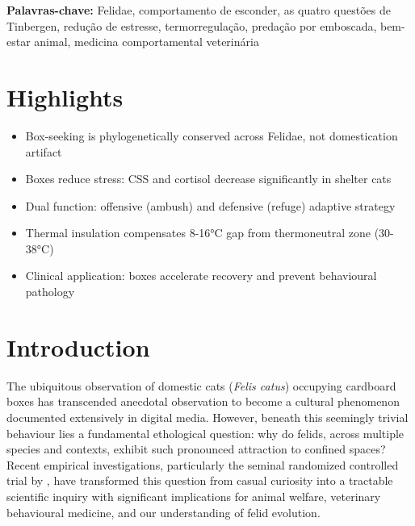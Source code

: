 \documentclass[12pt,a4paper]{article}
\begin{document}
\vspace{1em}

\noindent
\textbf{Palavras-chave:} Felidae, comportamento de esconder, as quatro questões de Tinbergen, redução de estresse, termorregulação, predação por emboscada, bem-estar animal, medicina comportamental veterinária

\newpage

\section*{Highlights}

\begin{itemize}
    \item Box-seeking is phylogenetically conserved across Felidae, not domestication artifact
    \item Boxes reduce stress: CSS and cortisol decrease significantly in shelter cats
    \item Dual function: offensive (ambush) and defensive (refuge) adaptive strategy
    \item Thermal insulation compensates 8-16°C gap from thermoneutral zone (30-38°C)
    \item Clinical application: boxes accelerate recovery and prevent behavioural pathology
\end{itemize}

\newpage

\section{Introduction}

The ubiquitous observation of domestic cats (\textit{Felis catus}) occupying cardboard boxes has transcended anecdotal observation to become a cultural phenomenon documented extensively in digital media. However, beneath this seemingly trivial behaviour lies a fundamental ethological question: why do felids, across multiple species and contexts, exhibit such pronounced attraction to confined spaces? Recent empirical investigations, particularly the seminal randomized controlled trial by \citet{vinke2014}, have transformed this question from casual curiosity into a tractable scientific inquiry with significant implications for animal welfare, veterinary behavioural medicine, and our understanding of felid evolution.
\end{document}
